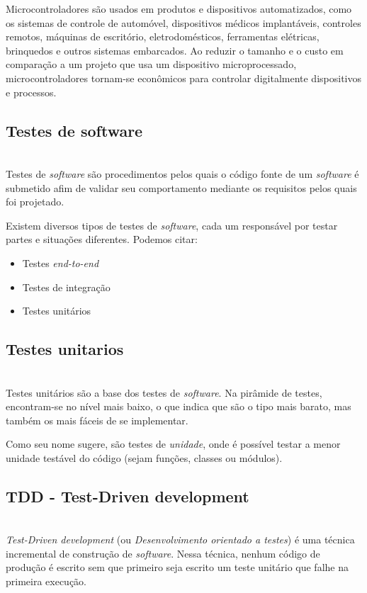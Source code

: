 \documentclass[times, twoside, watermark]{artigo}
\begin{document}
Microcontroladores são usados em produtos e dispositivos automatizados, como os 
sistemas de controle de automóvel, dispositivos médicos implantáveis,
controles remotos, máquinas de escritório, eletrodomésticos, ferramentas elétricas,
brinquedos e outros sistemas embarcados. \newline 
Ao reduzir o tamanho e o custo em comparação a um projeto que usa um dispositivo 
microprocessado, microcontroladores tornam-se econômicos para controlar
digitalmente dispositivos e processos. \cite{gridling2007introduction}

\subsection{Testes de software}\hfill\\
Testes de \textit{software} são procedimentos pelos quais o código fonte de um
\textit{software} é submetido afim de validar seu comportamento mediante
os requisitos pelos quais foi projetado.

Existem diversos tipos de testes de \textit{software}, cada um responsável por 
testar partes e situações diferentes. Podemos citar:

\begin{itemize}
\item Testes \textit{end-to-end}
\item Testes de integração
\item Testes unitários
\end{itemize}

\subsection{Testes unitarios}\hfill\\
Testes unitários são a base dos testes de \textit{software}. Na pirâmide de testes,
encontram-se no nível mais baixo, o que indica que são o tipo mais barato, mas
também os mais fáceis de se implementar.\cite{8402699}

Como seu nome sugere, são testes de \textit{unidade}, onde é possível testar a 
menor unidade testável do código (sejam funções, classes ou módulos).

\subsection{TDD - Test-Driven development}\hfill\\
\textit{Test-Driven development} (ou \textit{Desenvolvimento orientado a testes}) é uma técnica incremental de construção de \textit{software}. Nessa técnica, nenhum código de produção é escrito sem que primeiro seja escrito um teste unitário que falhe na primeira execução. 
\end{document}
